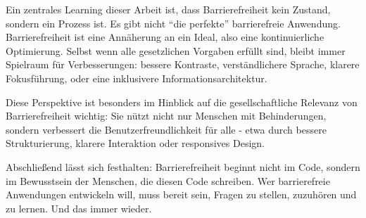 Ein zentrales Learning dieser Arbeit ist, dass Barrierefreiheit kein Zustand, sondern ein Prozess ist. Es gibt nicht \enquote{die perfekte} barrierefreie Anwendung. Barrierefreiheit ist eine Annäherung an ein Ideal, also eine kontinuierliche Optimierung. Selbst wenn alle gesetzlichen Vorgaben erfüllt sind, bleibt immer Spielraum für Verbesserungen: bessere Kontraste, verständlichere Sprache, klarere Fokusführung, oder eine inklusivere Informationsarchitektur.

Diese Perspektive ist besonders im Hinblick auf die gesellschaftliche Relevanz von Barrierefreiheit wichtig: Sie nützt nicht nur Menschen mit Behinderungen, sondern verbessert die Benutzerfreundlichkeit für alle - etwa durch bessere Strukturierung, klarere Interaktion oder responsives Design.

Abschließend lässt sich festhalten: Barrierefreiheit beginnt nicht im Code, sondern im Bewusstsein der Menschen, die diesen Code schreiben. Wer barrierefreie Anwendungen entwickeln will, muss bereit sein, Fragen zu stellen, zuzuhören und zu lernen. Und das immer wieder.

